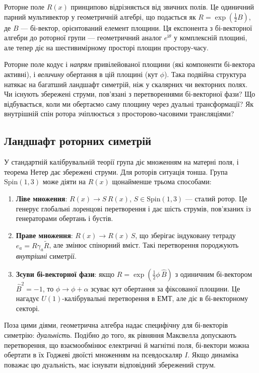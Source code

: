 \documentclass[11pt,a4paper]{article}
\numberwithin{equation}{section}
\theoremstyle{plain}
\theoremstyle{definition}
\theoremstyle{remark}
\newcommand{\ii}{\mathrm{i}}
\begin{document}
Роторне поле $R(x)$ принципово відрізняється від звичних полів. Це одиничний парний мультивектор у геометричній алгебрі, що подається як $R=\exp(\frac{1}{2}B)$, де $B$ — бі-вектор, орієнтований елемент площини. Ця експонента з бі-векторної алгебри до роторної групи — геометричний аналог $e^{\ii\theta}$ у комплексній площині, але тепер діє на шестивимірному просторі площин простору-часу.

Роторне поле кодує і \emph{напрям} привілейованої площини (які компоненти бі-вектора активні), і \emph{величину} обертання в цій площині (кут $\phi$). Така подвійна структура натякає на багатший ландшафт симетрій, ніж у скалярних чи векторних полях. Чи існують збережені струми, пов’язані з перетвореннями бі-векторної фази? Що відбувається, коли ми обертаємо саму площину через дуальні трансформації? Як внутрішній спін ротора зчіплюється з просторово-часовими трансляціями?

\subsection{Ландшафт роторних симетрій}

У стандартній калібрувальній теорії група діє множенням на матерні поля, і теорема Нетер дає збережені струми. Для роторів ситуація тонша. Група $\mathrm{Spin}(1,3)$ може діяти на $R(x)$ щонайменше трьома способами:

\begin{enumerate}
  \item \textbf{Ліве множення}: $R(x) \to S\,R(x)$, $S \in \mathrm{Spin}(1,3)$ — сталий ротор. Це генерує глобальні лоренцові перетворення і дає шість струмів, пов’язаних із генераторами обертань і бустів.

  \item \textbf{Праве множення}: $R(x) \to R(x)\,S$, що зберігає індуковану тетраду $e_a=R\gamma_a\widetilde{R}$, але змінює спінорний вміст. Такі перетворення породжують \emph{внутрішні} симетрії.

  \item \textbf{Зсуви бі-векторної фази}: якщо $R=\exp(\frac{1}{2}\phi\,\hat{B})$ з одиничним бі-вектором $\hat{B}^2=-1$, то $\phi\to\phi+\alpha$ зсуває кут обертання за фіксованої площини. Це нагадує $U(1)$-калібрувальні перетворення в ЕМТ, але діє в бі-векторному секторі.
\end{enumerate}

Поза цими діями, геометрична алгебра надає специфічну для бі-векторів симетрію: \emph{дуальність}. Подібно до того, як рівняння Максвелла допускають перетворення, що взаємообмінює електричні й магнітні поля, бі-вектори можна обертати в їх Годжеві двоїсті множенням на псевдоскаляр $I$. Якщо динаміка поважає цю дуальність, має існувати відповідний збережений струм.
\end{document}
